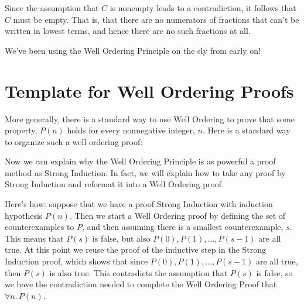 Since the assumption that $C$ is nonempty leads to a contradiction, it
follows that $C$ must be empty.  That is, that there are no numerators of
fractions that can't be written in lowest terms, and hence there are no
such fractions at all.

We've been using the Well Ordering Principle on the sly from early on!

\section{Template for Well Ordering Proofs}

More generally, there is a standard way to use Well Ordering to prove that
some property, $P(n)$ holds for every nonnegative integer, $n$.  Here is a
standard way to organize such a well ordering proof:


\iffalse
Now we can explain why the Well Ordering Principle is as powerful a proof
method as Strong Induction.  In fact, we will explain how to take any
proof by Strong Induction and reformat it into a Well Ordering proof.

Here's how: suppose that we have a proof Strong Induction with induction
hypothesis $P(n)$.  Then we start a Well Ordering proof by defining the
set of counterexamples to $P$, and then assuming there is a smallest
counterexample, $s$.  This means that $P(s)$ is false, but also $P(0),
P(1),\dots, P(s-1)$ are all true.  At this point we reuse the proof of the
inductive step in the Strong Induction proof, which shows that since
$P(0), P(1),\dots, P(s-1)$ are all true, then $P(s)$ is also true.  This
contradicts the assumption that $P(s)$ is false, so we have the
contradiction needed to complete the Well Ordering Proof that $\forall
n.\, P(n)$.

